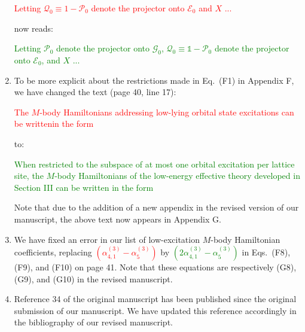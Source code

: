 \documentclass[preprint,showkeys,nofootinbib]{revtex4-1}
\newcommand{\p}[1]{\left(#1\right)} %
\newcommand{\E}{\mathcal{E}}
\newcommand{\G}{\mathcal{G}}
\renewcommand{\P}{\mathcal{P}}
\newcommand{\Q}{\mathcal{Q}}
\newcommand{\1}{\mathds{1}}
\newcommand{\red}[1]{\textcolor{red}{#1}}
\newcommand{\green}[1]{\textcolor{green}{#1}}
\begin{document}
\begin{enumerate}[label=(R3.\arabic*)]
  \red{Letting $\Q_0\equiv1-\P_0$ denote the projector onto $\E_0$ and
    $X$ ...}

  now reads:

  \green{Letting $\P_0$ denote the projector onto $\G_0$,
    $\Q_0\equiv\1-\P_0$ denote the projector onto $\E_0$, and $X$ ...}


\item To be more explicit about the restrictions made in Eq.~(F1) in
  Appendix F, we have changed the text (page 40, line 17):

  \red{The $M$-body Hamiltonians addressing low-lying orbital state
    excitations can be writtenin the form}

  to:

  \green{When restricted to the subspace of at most one orbital
    excitation per lattice site, the $M$-body Hamiltonians of the
    low-energy effective theory developed in Section III can be
    written in the form}

  Note that due to the addition of a new appendix in the revised
  version of our manuscript, the above text now appears in Appendix G.


\item We have fixed an error in our list of low-excitation $M$-body
  Hamiltonian coefficients, replacing
  \red{$\p{\alpha_{4,1}^{(3)} - \alpha_5^{(3)}}$} by
  \green{$\p{2\alpha_{4,1}^{(3)} - \alpha_5^{(3)}}$} in Eqs.~(F8),
  (F9), and (F10) on page 41.  Note that these equations are
  respectively (G8), (G9), and (G10) in the revised manuscript.


\item Reference 34 of the original manuscript has been published since
  the original submission of our manuscript.  We have updated this
  reference accordingly in the bibliography of our revised manuscript.

\end{enumerate}
\end{document}
